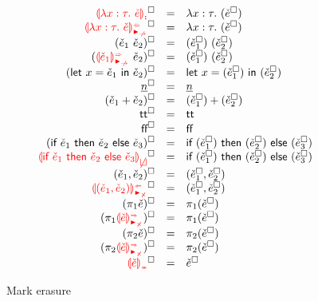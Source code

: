 \begin{figure}[htbp]
\[\begin{array}{rcl}
    \erasesToRow{\ECLamInconAsc{x}{\TMV}{\ECMV}}{\ELam{x}{\TMV}{(\erase{\ECMV})}} \\
    \erasesToRow{\ECLamAnaNonMatchedArrow{x}{\TMV}{\ECMV}}{\ECLam{x}{\TMV}{(\erase{\ECMV})}} \\
    \erasesToRow{(\ECAp{\ECMV_1}{\ECMV_2})}{\EAp{(\erase{\ECMV_1})}{(\erase{\ECMV_2})}} \\
    \erasesToRow{(\ECApSynNonMatchedArrow{\ECMV_1}{\ECMV_2})}{\ECAp{(\erase{\ECMV_1})}{(\erase{\ECMV_2})}} \\
    \erasesToRow{(\ECLet{x}{\ECMV_1}{\ECMV_2})}{\ELet{x}{(\erase{\ECMV_1})}{(\erase{\ECMV_2})}} \\
    \erasesToRow{\ECNumMV}{\ENumMV} \\
    \erasesToRow{(\ECPlus{\ECMV_1}{\ECMV_2})}{\EPlus{(\erase{\ECMV_1})}{(\erase{\ECMV_2})}} \\
    \erasesToRow{\ECTrue}{\ETrue} \\
    \erasesToRow{\ECFalse}{\EFalse} \\
    \erasesToRow{(\ECIf{\ECMV_1}{\ECMV_2}{\ECMV_3})}{\EIf{(\erase{\ECMV_1})}{(\erase{\ECMV_2})}{(\erase{\ECMV_3})}} \\
    \erasesToRow{\ECInconBr{\ECMV_1}{\ECMV_2}{\ECMV_3}}{\EIf{(\erase{\ECMV_1})}{(\erase{\ECMV_2})}{(\erase{\ECMV_3})}} \\
    \erasesToRow{\ECPair{\ECMV_1}{\ECMV_2}}{\ECPair{\erase{\ECMV_1}}{\erase{\ECMV_2}}} \\
    \erasesToRow{\ECPairAnaNonMatchedProd{\ECMV_1}{\ECMV_2}}{\ECPair{\erase{\ECMV_1}}{\erase{\ECMV_2}}} \\
    \erasesToRow{(\ECProjL{\ECMV})}{\ECProjL{(\erase{\ECMV})}} \\
    \erasesToRow{(\ECProjLSynNonMatchedProd{\ECMV})}{\ECProjL{(\erase{\ECMV})}} \\
    \erasesToRow{(\ECProjR{\ECMV})}{\ECProjR{(\erase{\ECMV})}} \\
    \erasesToRow{(\ECProjRSynNonMatchedProd{\ECMV})}{\ECProjR{(\erase{\ECMV})}} \\
    \erasesToRow{\ECInconType{\ECMV}}{\erase{\ECMV}}
  \end{array}\]

  \caption{Mark erasure}
  \label{fig:calculus-mark-erasure}
\end{figure}
